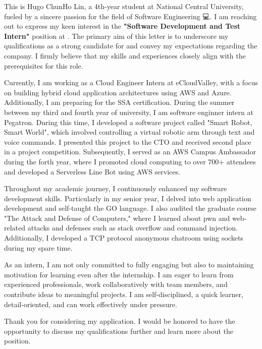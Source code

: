 
This is Hugo ChunHo Lin, a 4th-year student at 
National Central University, fueled by a sincere passion for the field of Software Engineering 💻.
I am reaching out to express my keen interest in 
the \textbf{"Software Development and Test Intern"} position at 
\company. The primary aim of this letter is to 
underscore my qualifications as a strong candidate 
for \company and convey my expectations regarding 
the company. I firmly believe that my skills and 
experiences closely align with the prerequisites 
for this role.

Currently, I am working as a Cloud Engineer Intern 
at eCloudValley, with a focus on building 
hybrid cloud application architectures using 
AWS and Azure. Additionally, I am preparing 
for the SSA certification. 
During the summer between my third and 
fourth year of university, I am software enginner intern at Pegatron. 
During this time, I developed a software project 
called "Smart Robot, Smart World", which 
involved controlling a virtual robotic arm 
through text and voice commands. I presented 
this project to the CTO and received 
second place in a project competition. 
Subsequently, I served as an AWS Campus Ambassador 
during the forth year, where I promoted 
cloud computing to over 700+ attendees and 
developed a Serverless Line Bot using AWS 
services.

Throughout my academic journey, I continuously 
enhanced my software development skills. 
Particularly in my senior year, I delved 
into web application development and self-taught 
the GO language. I also audited the 
graduate course "The Attack and Defense of Computers," 
where I learned about pwn and web-related 
attacks and defenses such as stack overflow 
and command injection. Additionally, 
I developed a TCP protocol anonymous 
chatroom using sockets during my spare time.


As an intern, I am not only committed to fully engaging but also to maintaining motivation for learning even after the internship. I am eager to learn from experienced professionals, work collaboratively with team members, and contribute ideas to meaningful projects. I am self-disciplined, a quick learner, detail-oriented, and can work effectively under pressure.

Thank you for considering my application. I would be honored to have the opportunity to discuss my qualifications further and learn more about the position.
